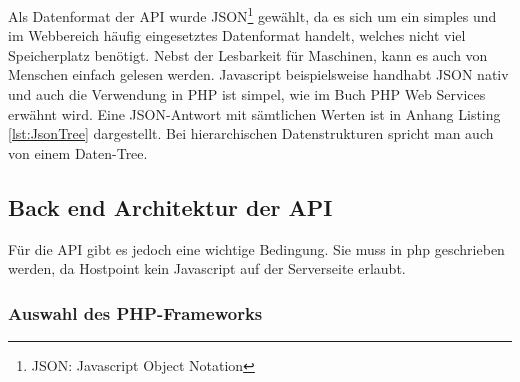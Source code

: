 Als Datenformat der API wurde JSON\footnote{JSON: Javascript Object Notation} gewählt, da es sich um ein simples und im Webbereich häufig eingesetztes Datenformat handelt, welches nicht viel Speicherplatz benötigt. Nebst der Lesbarkeit für Maschinen, kann es auch von Menschen einfach gelesen werden. Javascript beispielsweise handhabt JSON nativ und auch die Verwendung in PHP ist simpel, wie im Buch PHP Web Services \cite{LornaJaneMitchell2013oreilly} erwähnt wird. Eine JSON-Antwort mit sämtlichen Werten ist in Anhang Listing \ref{lst:JsonTree} dargestellt. Bei hierarchischen Datenstrukturen spricht man auch von einem Daten-Tree.

\subsection{Back end Architektur der API}
Für die API gibt es jedoch eine wichtige Bedingung. Sie muss in php geschrieben werden, da Hostpoint kein Javascript auf der Serverseite erlaubt.



\subsubsection{Auswahl des PHP-Frameworks}



